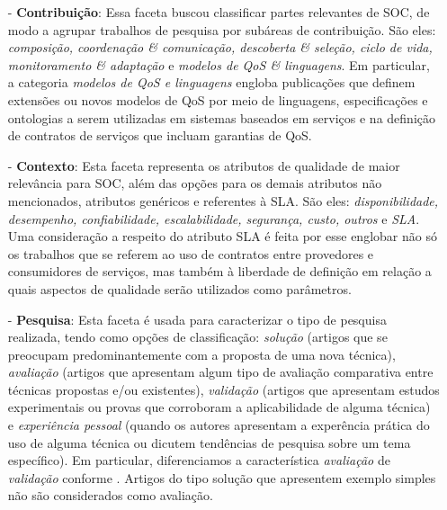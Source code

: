 \begin{itemize}
\item[-] \textbf{Contribuição}: Essa faceta buscou classificar partes relevantes de SOC, de modo a agrupar trabalhos de pesquisa por subáreas de contribuição. São eles: \emph{composição, coordenação \& comunicação, descoberta \& seleção, ciclo de vida, monitoramento \& adaptação} e  \emph{modelos de QoS \& linguagens}. Em particular, a categoria \emph{modelos de QoS e linguagens} engloba publicações que definem extensões ou novos modelos de QoS por meio de linguagens, especificações e ontologias a serem utilizadas em sistemas baseados em serviços e na definição de contratos de serviços que incluam garantias de QoS.

\item[-] \textbf{Contexto}: Esta faceta representa os atributos de qualidade de maior relevância para SOC, além das opções para os demais atributos não mencionados, atributos genéricos e referentes à SLA. São eles: \emph{disponibilidade, desempenho, confiabilidade, escalabilidade, segurança, custo, outros} e \emph{SLA}. Uma consideração a respeito do atributo SLA é feita por esse englobar não só os trabalhos que se referem ao uso de contratos entre provedores e consumidores de serviços, mas também à liberdade de definição em relação a quais aspectos de qualidade serão utilizados como parâmetros.

\item[-] \textbf{Pesquisa}: Esta faceta \'{e} usada para caracterizar o tipo de pesquisa realizada, tendo como op\c c\~{o}es de classifica\c c\~{a}o: 
\emph{solu\c c\~{a}o} (artigos que se preocupam predominantemente com a proposta de uma nova t\'{e}cnica), \emph{avalia\c c\~{a}o} (artigos que apresentam 
algum tipo de avalia\c c\~{a}o comparativa entre t\'{e}cnicas propostas e/ou existentes), \emph{validação} (artigos que apresentam 
estudos experimentais ou provas que corroboram a aplicabilidade de alguma t\'{e}cnica) e \emph{experiência pessoal} (quando os autores 
apresentam a exper\^{e}ncia pr\'{a}tica do uso de alguma t\'{e}cnica ou dicutem tend\^{e}ncias de pesquisa sobre um tema espec\'{i}fico). Em particular, diferenciamos a caracter\'{i}stica \emph{avalia\c{c}\~{a}o} de \emph{valida\c{c}\~{a}o} conforme \cite{Wieringa:10.1007/s00766-005-0021-6}. Artigos do tipo solução que apresentem exemplo simples não são considerados como avaliação.
\end{itemize}


